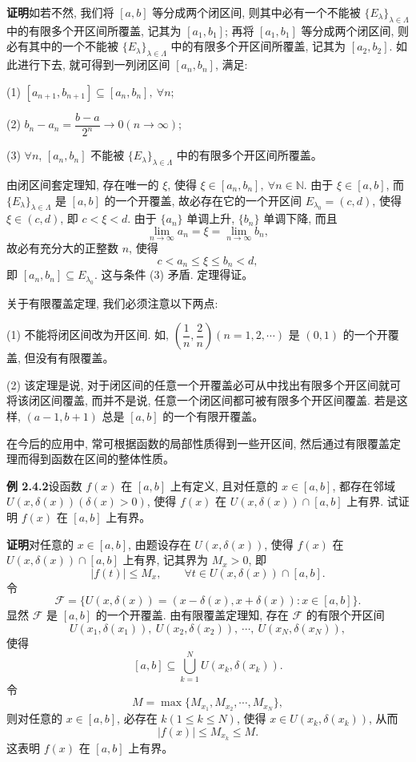 \documentclass[UTF8, 12pt, fontset=fandol, oneside]{ctexart}
\begin{document}
\noindent\textbf{证明}\quad 如若不然, 我们将 $[a,b]$ 等分成两个闭区间, 则其中必有一个不能被 $\{E_\lambda\}_{\lambda\in\Lambda}$ 中的有限多个开区间所覆盖, 记其为 $[a_1,b_1]$; 再将 $[a_1,b_1]$ 等分成两个闭区间, 则必有其中的一个不能被 $\{E_\lambda\}_{\lambda\in\Lambda}$ 中的有限多个开区间所覆盖, 记其为 $[a_2,b_2]$. 如此进行下去, 就可得到一列闭区间 $[a_n,b_n]$, 满足:

(1) $[a_{n+1},b_{n+1}]\subseteq[a_n,b_n],\ \forall n$;

(2) $b_n-a_n=\dfrac{b-a}{2^n}\to0(n\to\infty)$;

(3) $\forall n$, $[a_n,b_n]$ 不能被 $\{E_\lambda\}_{\lambda\in\Lambda}$ 中的有限多个开区间所覆盖。

由闭区间套定理知, 存在唯一的 $\xi$, 使得 $\xi\in[a_n,b_n],\ \forall n\in\mathbb{N}$. 由于 $\xi\in[a,b]$, 而 $\{E_\lambda\}_{\lambda\in\Lambda}$ 是 $[a,b]$ 的一个开覆盖, 故必存在它的一个开区间 $E_{\lambda_0}=(c,d)$, 使得 $\xi\in(c,d)$, 即 $c<\xi<d$. 由于 $\{a_n\}$ 单调上升, $\{b_n\}$ 单调下降, 而且
\[
  \lim_{n\to\infty}a_n=\xi=\lim_{n\to\infty}b_n,
\]
故必有充分大的正整数 $n$, 使得
\[
  c<a_n\leqslant\xi\leqslant b_n<d,
\]
即 $[a_n,b_n]\subseteq E_{\lambda_0}$. 这与条件 (3) 矛盾. 定理得证。

关于有限覆盖定理, 我们必须注意以下两点:

(1) 不能将闭区间改为开区间. 如, $\left(\dfrac1n,\dfrac2n\right)(n=1,2,\cdots)$ 是 $(0,1)$ 的一个开覆盖, 但没有有限覆盖。

(2) 该定理是说, 对于闭区间的任意一个开覆盖必可从中找出有限多个开区间就可将该闭区间覆盖, 而并不是说, 任意一个闭区间都可被有限多个开区间覆盖. 若是这样, $(a-1,b+1)$ 总是 $[a,b]$ 的一个有限开覆盖。

在今后的应用中, 常可根据函数的局部性质得到一些开区间, 然后通过有限覆盖定理而得到函数在区间的整体性质。

\noindent\textbf{例 2.4.2}\quad 设函数 $f(x)$ 在 $[a,b]$ 上有定义, 且对任意的 $x\in[a,b]$, 都存在邻域 $U(x,\delta(x))(\delta(x)>0)$, 使得 $f(x)$ 在 $U(x,\delta(x))\cap[a,b]$ 上有界. 试证明 $f(x)$ 在 $[a,b]$ 上有界。

\noindent\textbf{证明}\quad 对任意的 $x\in[a,b]$, 由题设存在 $U(x,\delta(x))$, 使得 $f(x)$ 在 $U(x,\delta(x))\cap[a,b]$ 上有界, 记其界为 $M_x>0$, 即
\[
  |f(t)|\leqslant M_x,\qquad \forall t\in U(x,\delta(x))\cap[a,b].
\]
令
\[
  \mathcal{F}=\{U(x,\delta(x))=(x-\delta(x),x+\delta(x)):x\in[a,b]\}.
\]
显然 $\mathcal{F}$ 是 $[a,b]$ 的一个开覆盖. 由有限覆盖定理知, 存在 $\mathcal{F}$ 的有限个开区间
\[
  U(x_1,\delta(x_1)),\ U(x_2,\delta(x_2)),\ \cdots,\ U(x_N,\delta(x_N)),
\]
使得
\[
  [a,b]\subseteq\bigcup_{k=1}^N U(x_k,\delta(x_k)).
\]
令
\[
  M=\max\{M_{x_1},M_{x_2},\cdots,M_{x_N}\},
\]
则对任意的 $x\in[a,b]$, 必存在 $k(1\leqslant k\leqslant N)$, 使得 $x\in U(x_k,\delta(x_k))$, 从而
\[
  |f(x)|\leqslant M_{x_k}\leqslant M.
\]
这表明 $f(x)$ 在 $[a,b]$ 上有界。
\end{document}
